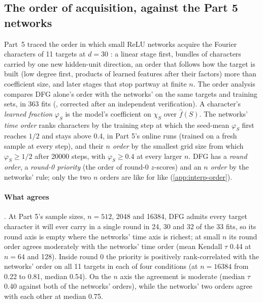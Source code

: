 \subsection{The order of acquisition, against the Part 5 networks}\label{sec:interp-order}

Part~5 traced the order in which small ReLU networks acquire the Fourier characters of 11  targets at $d=30$ \cite{gdcircuit2026}: a linear stage first, bundles of characters carried by one new hidden-unit direction, an order that follows how the target is built (low degree first, products of learned features after their factors) more than coefficient size, and later stages that stop partway at finite $n$. The order analysis compares DFG alone's order with the networks' on the same targets and training sets, in 363 fits (, corrected after an independent verification). A character's \emph{learned fraction} $\varphi_S$ is the model's coefficient on $\chi_S$ over $\hat f(S)$. The networks' \emph{time order} ranks characters by the training step at which the seed-mean $\varphi_S$ first reaches $1/2$ and stays above 0.4, in Part 5's online runs (trained on a fresh sample at every step), and their \emph{$n$ order} by the smallest grid size from which $\varphi_S\ge1/2$ after 20000 steps, with $\varphi_S\ge0.4$ at every larger $n$. DFG has a \emph{round order}, a \emph{round-0 priority} (the order of round-0 $z$-scores) and an \emph{$n$ order} by the networks' rule; only the two $n$ orders are like for like (\cref{app:interp-order}).

\paragraph{What agrees} . At Part 5's sample sizes, $n=512$, 2048 and 16384, DFG admits every target character it will ever carry in a single round in 24, 30 and 32 of the 33 fits, so its round axis is empty where the networks' time axis is richest; at small $n$ its round order agrees moderately with the networks' time order (mean Kendall $\tau$ 0.44 at $n=64$ and 128). Inside round 0 the priority is positively rank-correlated with the networks' order on all 11 targets in each of four conditions (at $n=16384$ from 0.22 to 0.81, median 0.54). On the $n$ axis the agreement is moderate (median $\tau$ 0.40 against both of the networks' orders), while the networks' two orders agree with each other at median 0.75.


